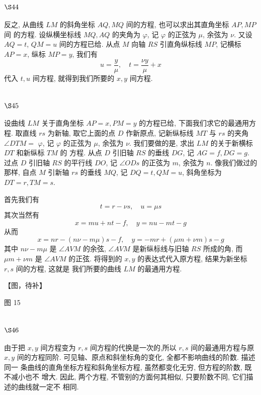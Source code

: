 \section{$\S 44$}

反之, 从曲线 $L M$ 的斜角坐标 $A Q, M Q$ 间的方程, 也可以求出其直角坐标 $A P, M P$ 间 的方程. 设纵横坐标线 $M Q, A Q$ 的夹角为 $\varphi$, 记 $\varphi$ 的正弦为 $\mu$, 余弦为 $\nu$. 又设 $A Q=t$, $Q M=u$ 间的方程已给. 从点 $M$ 向轴 $R S$ 引直角纵标线 $M P$, 记横标 $A P=x$, 纵标 $M P=y$, 我们有
\[
u=\frac{y}{\mu}, \quad t=\frac{\nu y}{\mu}+x
\]
代入 $t, u$ 间方程, 就得到我们所要的 $x, y$ 间方程.

\section{$\S 45$}

设曲线 $L M$ 关于直角坐标 $A P=x, P M=y$ 的方程已给, 下面我们求它的最通用方 程. 取直线 $r s$ 为新轴, 取它上面的点 $D$ 作新原点, 记新纵标线 $M T$ 与 $r s$ 的夹角 $\angle D T M=$ $\varphi$, 记 $\varphi$ 的正弦为 $\mu$, 余弦为 $\nu$. 我们要做的是, 求出 $L M$ 的关于新横标 $D T$ 和新纵标 $T M$ 的 方程. 从点 $D$ 引旧轴 $R S$ 的垂线 $D G$, 记 $A G=f, D G=g$. 过点 $D$ 引旧轴 $R S$ 的平行线 $D O$, 记 $\angle O D s$ 的正弦为 $m$, 余弦为 $n$. 像我们做过的那样, 自点 $M$ 引新轴 $r s$ 的垂线 $M Q$, 记 $D Q=t, Q M=u$, 斜角坐标为 $D T=r, T M=s$.

首先我们有
\[
t=r-\nu s, \quad u=\mu s
\]
其次当然有
\[
x=m u+n t-f, \quad y=n u-m t-g
\]
从而
\[
x=n r-(n \nu-m \mu) s-f, \quad y=-m r+(\mu m+\nu m) s-g
\]
其中 $n \nu-m \mu$ 是 $\angle A V M$ 的余弦, $\angle A V M$ 是新纵标线与旧轴 $R S$ 所成的角, 而 $\mu m+\nu m$ 是 $\angle A V M$ 的正弦. 将得到的 $x, y$ 的表达式代入原方程, 结果为新坐标 $r, s$ 间的方程, 这就是 我们所要的曲线 $L M$ 的最通用方程.


【图，待补】

图 15 

\section{$\S 46$}

由于把 $x, y$ 间方程变为 $r, s$ 间方程的代换是一次的,所以 $r, s$ 间的最通用方程与原 $x, y$ 间的方程同阶. 可见轴、原点和斜坐标角的变化, 全都不影响曲线的阶数. 描述同一 条曲线的直角坐标方程和斜角坐标方程, 虽然都变化无穷, 但方程的阶数, 既不减小也不 增大. 因此, 两个方程, 不管别的方面何其相似, 只要阶数不同, 它们描述的曲线就一定不 相同. 

